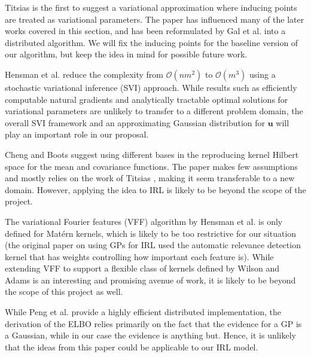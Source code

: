 \documentclass{mprop}
\theoremstyle{definition}
\begin{document}
Titsias \cite{DBLP:journals/jmlr/Titsias09} is the first to suggest a
variational approximation where inducing points are treated as variational
parameters. The paper has influenced many of the later works covered in this
section, and has been reformulated by Gal et al. \cite{DBLP:conf/nips/GalWR14}
into a distributed algorithm. We will fix the inducing points for the baseline
version of our algorithm, but keep the idea in mind for possible future work.

Hensman et al. \cite{DBLP:conf/uai/HensmanFL13} reduce the complexity from
$\mathcal{O}(nm^2)$ to $\mathcal{O}(m^3)$ using a stochastic variational
inference (SVI) approach. While results such as efficiently computable natural
gradients and analytically tractable optimal solutions for variational
parameters are unlikely to transfer to a different problem domain, the overall
SVI framework and an approximating Gaussian distribution for $\mathbf{u}$ will
play an important role in our proposal.

Cheng and Boots \cite{DBLP:conf/nips/ChengB17} suggest using different bases in
the reproducing kernel Hilbert space for the mean and covariance functions.
The paper makes few assumptions and mostly relies on the work of
Titsias \cite{DBLP:journals/jmlr/Titsias09}, making it seem transferable to a
new domain. However, applying the idea to IRL is likely to be beyond the scope
of the project.

The variational Fourier features (VFF) algorithm by Hensman et al.
\cite{DBLP:journals/jmlr/HensmanDS17} is only defined for Mat\'ern kernels,
which is likely to be too restrictive for our situation (the original paper on
using GPs for IRL \cite{DBLP:conf/nips/LevinePK11} used the automatic relevance
detection kernel that has weights controlling how important each feature is).
While extending VFF to support a flexible class of kernels defined by Wilson and
Adams \cite{pmlr-v28-wilson13} is an interesting and promising avenue of work,
it is likely to be beyond the scope of this project as well.

While Peng et al. \cite{DBLP:conf/icml/PengZZQ17} provide a highly efficient
distributed implementation, the derivation of the ELBO relies primarily on the
fact that the evidence for a GP is a Gaussian, while in our case the evidence is
anything but. Hence, it is unlikely that the ideas from this paper could be
applicable to our IRL model.
\end{document}

